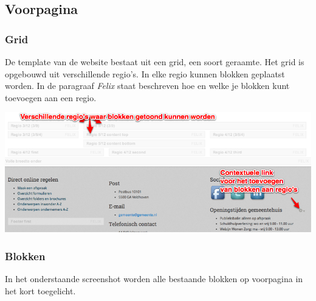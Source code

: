 
\subsection{Voorpagina}\label{voorpagina}

\subsubsection{Grid}

De template van de website bestaat uit een grid, een soort geraamte. Het grid is opgebouwd uit verschillende regio's. In elke regio kunnen blokken geplaatst worden. In de paragraaf \emph{Felix} staat beschreven hoe en welke je blokken kunt toevoegen aan een regio. 

\bigskip

\begin{center}
	\includegraphics[width=\textwidth]{img/grid1.png}
\end{center}

\subsubsection{Blokken}

In het onderstaande screenshot worden alle bestaande blokken op voorpagina in het kort toegelicht.

\bigskip

